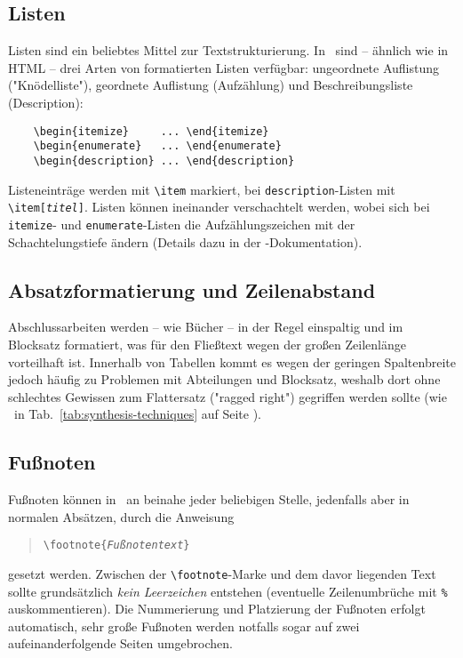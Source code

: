 \subsection{Listen}

Listen sind ein beliebtes Mittel zur Textstrukturierung. In
\latex\ sind -- ähnlich wie in HTML -- drei Arten von formatierten
Listen verfügbar: ungeordnete Auflistung ("Knödelliste"),
geordnete Auflistung (Aufzählung) und Beschreibungsliste
(Description):
%
\begin{verbatim}
    \begin{itemize}     ... \end{itemize}
    \begin{enumerate}   ... \end{enumerate}
    \begin{description} ... \end{description}
\end{verbatim}
%
Listeneinträge werden mit \verb!\item! markiert, bei \texttt{description}-Listen mit \verb!\item[!\texttt{\em titel}\verb!]!. Listen
können ineinander verschachtelt werden, wobei sich bei \texttt{itemize}- und \texttt{enumerate}-Listen die Aufzählungszeichen mit
der Schachtelungstiefe ändern (Details dazu in der
\latex-Dokumentation).


\subsection{Absatzformatierung und Zeilenabstand}

Abschlussarbeiten werden -- wie Bücher -- in der Regel einspaltig und
im Blocksatz formatiert, was für den Fließtext wegen der großen
Zeilenlänge vorteilhaft ist. Innerhalb von Tabellen kommt es
wegen der geringen Spaltenbreite jedoch häufig zu Problemen mit
Abteilungen und Blocksatz, weshalb dort ohne schlechtes
Gewissen zum Flattersatz ("ragged right") gegriffen werden sollte (wie
\zB\ in Tab.~\ref{tab:synthesis-techniques} auf Seite
\pageref{tab:synthesis-techniques}).


\subsection{Fußnoten}
Fußnoten können in \latex\ an beinahe jeder beliebigen Stelle,
jedenfalls aber in normalen Absätzen, durch die Anweisung
%
\begin{quote}
\verb!\footnote{!\texttt{\em Fußnotentext}\verb!}!
\end{quote}
%
gesetzt werden. Zwischen der \verb!\footnote!-Marke und dem davor
liegenden Text sollte grundsätzlich \emph{kein Leerzeichen} entstehen (eventuelle
Zeilen\-um\-brüche mit \verb!%! auskommentieren).
Die Nummerierung und Platzierung der Fußnoten
erfolgt automatisch, sehr große Fußnoten werden notfalls sogar auf
zwei aufeinanderfolgende Seiten umgebrochen.


